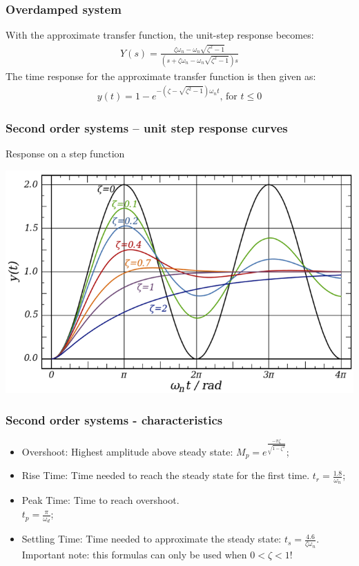 \begin{frame}
\frametitle{Overdamped system}
With the approximate transfer function, the unit-step response becomes:
\begin{align*}
 Y(s) = \frac{\zeta\omega_n - \omega_n\sqrt{\zeta^2-1}}{(s+\zeta\omega_n -\omega_n\sqrt{\zeta^2-1})s}
\end{align*}
The time response for the approximate transfer function is then given as:\\ 
\begin{align*}
y(t)= 1 -e^{-(\zeta-\sqrt{\zeta^2 -1})\omega_n t}\text{, for }t\le 0
\end{align*}
\end{frame}

\begin{frame}
\frametitle{Second order systems – unit step response curves}
Response on a step function
\begin{center}
	\includegraphics[width=0.8\linewidth]{Afbeelding6}
\end{center}
\end{frame}

\begin{frame}
\frametitle{Second order systems - characteristics}
\begin{itemize}
	\item Overshoot: Highest amplitude above steady state:  $M_p = e^{\frac{-\pi\zeta}{\sqrt{1-\zeta^2}}}$;
	\item Rise Time: Time needed to reach the steady state for the first time. $t_r = \frac{1.8}{\omega_n}$;
	\item Peak Time: Time to reach overshoot.\\$t_p =\frac{\pi}{\omega_d}$;
	\item Settling Time: Time needed to approximate the steady state: $t_s = \frac{4.6}{\zeta\omega_n}$. Important note: this formulas can only be used when  $0<\zeta<1$!
\end{itemize} 
\end{frame}


